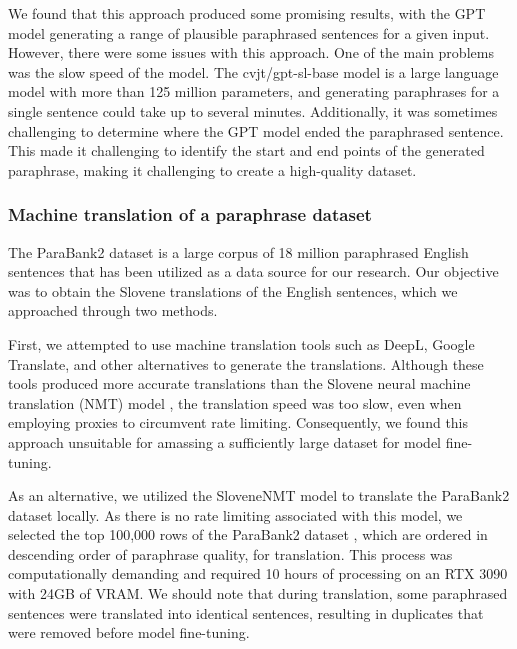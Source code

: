 \documentclass[fleqn,moreauthors,10pt]{ds_report}
\begin{document}
We found that this approach produced some promising results, with the GPT model generating a range of plausible paraphrased sentences for a given input. However, there were some issues with this approach. One of the main problems was the slow speed of the model. The cvjt/gpt-sl-base model \cite{huggingface_gptslbase} is a large language model with more than 125 million parameters, and generating paraphrases for a single sentence could take up to several minutes. Additionally, it was sometimes challenging to determine where the GPT model ended the paraphrased sentence. This made it challenging to identify the start and end points of the generated paraphrase, making it challenging to create a high-quality dataset.

\subsubsection*{Machine translation of a paraphrase dataset}
The ParaBank2 dataset \cite{hu2019parabank} is a large corpus of 18 million paraphrased English sentences that has been utilized as a data source for our research. Our objective was to obtain the Slovene translations of the English sentences, which we approached through two methods.

First, we attempted to use machine translation tools such as DeepL, Google Translate, and other alternatives to generate the translations. Although these tools produced more accurate translations than the Slovene neural machine translation (NMT) model \cite{lebar2022neural}, the translation speed was too slow, even when employing proxies to circumvent rate limiting. Consequently, we found this approach unsuitable for amassing a sufficiently large dataset for model fine-tuning.

As an alternative, we utilized the SloveneNMT model \cite{lebar2022neural} to translate the ParaBank2 dataset locally. As there is no rate limiting associated with this model, we selected the top 100,000 rows of the ParaBank2 dataset \cite{hu2019parabank}, which are ordered in descending order of paraphrase quality, for translation. This process was computationally demanding and required 10 hours of processing on an RTX 3090 with 24GB of VRAM. We should note that during translation, some paraphrased sentences were translated into identical sentences, resulting in duplicates that were removed before model fine-tuning.
\end{document}
